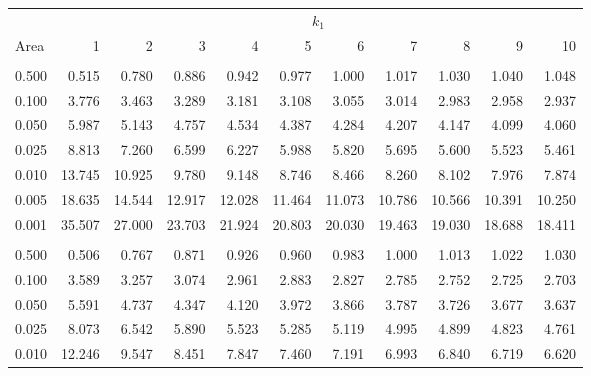 \documentclass[
]{article}
\begin{document}
\begin{longtable}[t]{lrrrrrrrrrr}
\toprule
\multicolumn{1}{c}{ } & \multicolumn{10}{c}{$k_1$} \\
\cmidrule(l{3pt}r{3pt}){2-11}
Area & 1 & 2 & 3 & 4 & 5 & 6 & 7 & 8 & 9 & 10\\
\midrule
\addlinespace[0.3em]
\multicolumn{11}{l}{\textbf{$k_2=6$}}\\
\hspace{1em}0.500 & 0.515 & 0.780 & 0.886 & 0.942 & 0.977 & 1.000 & 1.017 & 1.030 & 1.040 & 1.048\\
\hspace{1em}0.100 & 3.776 & 3.463 & 3.289 & 3.181 & 3.108 & 3.055 & 3.014 & 2.983 & 2.958 & 2.937\\
\hspace{1em}0.050 & 5.987 & 5.143 & 4.757 & 4.534 & 4.387 & 4.284 & 4.207 & 4.147 & 4.099 & 4.060\\
\hspace{1em}0.025 & 8.813 & 7.260 & 6.599 & 6.227 & 5.988 & 5.820 & 5.695 & 5.600 & 5.523 & 5.461\\
\hspace{1em}0.010 & 13.745 & 10.925 & 9.780 & 9.148 & 8.746 & 8.466 & 8.260 & 8.102 & 7.976 & 7.874\\
\hspace{1em}0.005 & 18.635 & 14.544 & 12.917 & 12.028 & 11.464 & 11.073 & 10.786 & 10.566 & 10.391 & 10.250\\
\hspace{1em}0.001 & 35.507 & 27.000 & 23.703 & 21.924 & 20.803 & 20.030 & 19.463 & 19.030 & 18.688 & 18.411\\
\addlinespace[0.3em]
\multicolumn{11}{l}{\textbf{$k_2=7$}}\\
\hspace{1em}0.500 & 0.506 & 0.767 & 0.871 & 0.926 & 0.960 & 0.983 & 1.000 & 1.013 & 1.022 & 1.030\\
\hspace{1em}0.100 & 3.589 & 3.257 & 3.074 & 2.961 & 2.883 & 2.827 & 2.785 & 2.752 & 2.725 & 2.703\\
\hspace{1em}0.050 & 5.591 & 4.737 & 4.347 & 4.120 & 3.972 & 3.866 & 3.787 & 3.726 & 3.677 & 3.637\\
\hspace{1em}0.025 & 8.073 & 6.542 & 5.890 & 5.523 & 5.285 & 5.119 & 4.995 & 4.899 & 4.823 & 4.761\\
\hspace{1em}0.010 & 12.246 & 9.547 & 8.451 & 7.847 & 7.460 & 7.191 & 6.993 & 6.840 & 6.719 & 6.620\\

\end{longtable}
\end{document}
